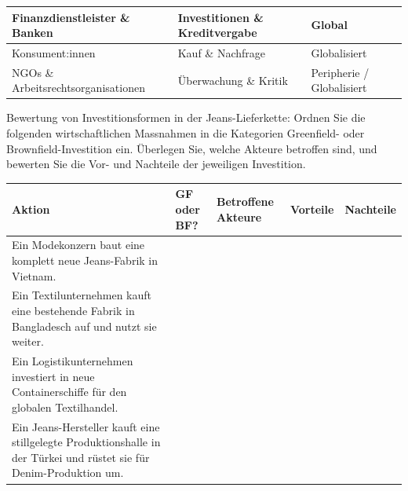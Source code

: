 \begin{myexercise}
\begin{myanswer}
\begin{table}[H]
\begin{tabular}{p{4cm}||p{5cm}|p{3cm}}
                Finanzdienstleister \& Banken       & Investitionen \& Kreditvergabe       & Global                          \\\midrule
                Konsument:innen                     & Kauf \& Nachfrage                    & Globalisiert                    \\\midrule
                NGOs \& Arbeitsrechtsorganisationen & Überwachung \& Kritik                & Peripherie / Globalisiert
            \end{tabular}
        \end{table}
    \end{myanswer}
\end{myexercise}

\begin{myexercise}
    Bewertung von Investitionsformen in der Jeans-Lieferkette:
    Ordnen Sie die folgenden wirtschaftlichen Massnahmen in die Kategorien Greenfield- oder Brownfield-Investition ein. Überlegen Sie, welche Akteure betroffen sind, und bewerten Sie die Vor- und Nachteile der jeweiligen Investition.
    \begin{table}[H]
        \footnotesize
        \centering
        \begin{tabular}{p{3cm}||p{1cm}|p{3.5cm}|p{3cm}|p{3cm}}
            \textbf{Aktion}                                                                                                     & \textbf{GF oder BF?} & \textbf{Betroffene Akteure} & \textbf{Vorteile} & \textbf{Nachteile} \\
            \midrule\midrule
            Ein Modekonzern baut eine komplett neue Jeans-Fabrik in Vietnam.                                                    &                      &                             &                   &                    \\[1.2cm]\midrule
            Ein Textilunternehmen kauft eine bestehende Fabrik in Bangladesch auf und nutzt sie weiter.                         &                      &                             &                   &                    \\[1.2cm]\midrule
            Ein Logistikunternehmen investiert in neue Containerschiffe für den globalen Textilhandel.                          &                      &                             &                   &                    \\[1.2cm]\midrule
            Ein Jeans-Hersteller kauft eine stillgelegte Produktionshalle in der Türkei und rüstet sie für Denim-Produktion um. &                      &                             &                   &                    \\[1.2cm]%

\end{tabular}
\end{table}
\end{myexercise}
